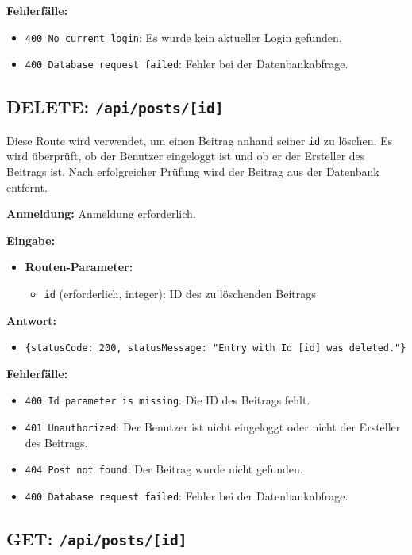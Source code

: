 \documentclass[a4paper,12pt]{article}
\begin{document}
\textbf{Fehlerfälle:}
\begin{itemize}
    \item \texttt{400 No current login}:
        Es wurde kein aktueller Login gefunden.
    \item \texttt{400 Database request failed}:
        Fehler bei der Datenbankabfrage.
\end{itemize}

\newpage
\subsection{DELETE: \texttt{/api/posts/[id]}}

Diese Route wird verwendet, um einen Beitrag anhand seiner \texttt{id} zu
löschen. Es wird überprüft, ob der Benutzer eingeloggt ist und ob er der
Ersteller des Beitrags ist. Nach erfolgreicher Prüfung wird der Beitrag aus der
Datenbank entfernt.

\textbf{Anmeldung:} Anmeldung erforderlich.

\textbf{Eingabe:}
\begin{itemize}
    \item \textbf{Routen-Parameter:}
    \begin{itemize}
        \item \texttt{id} (erforderlich, integer):
            ID des zu löschenden Beitrags
    \end{itemize}
\end{itemize}

\textbf{Antwort:}
\begin{itemize}
    \item \texttt{\{statusCode: 200,
        statusMessage: "Entry with Id [id] was deleted."\}}
\end{itemize}

\textbf{Fehlerfälle:}
\begin{itemize}
    \item \texttt{400 Id parameter is missing}:
        Die ID des Beitrags fehlt.
    \item \texttt{401 Unauthorized}:
        Der Benutzer ist nicht eingeloggt oder nicht der Ersteller des Beitrags.
    \item \texttt{404 Post not found}:
        Der Beitrag wurde nicht gefunden.
    \item \texttt{400 Database request failed}:
        Fehler bei der Datenbankabfrage.
\end{itemize}

\newpage
\subsection{GET: \texttt{/api/posts/[id]}}
\end{document}
